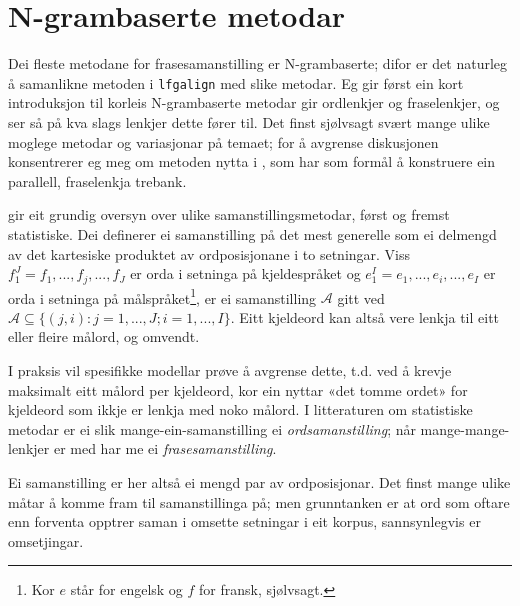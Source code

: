 \documentclass[11pt,a4paper,oneside,draft]{book}
\begin{document}
\section{N-grambaserte metodar}
\label{sec-5.2}


 Dei fleste metodane for frasesamanstilling er N-grambaserte; difor er
 det naturleg å samanlikne metoden i \texttt{lfgalign} med slike metodar. Eg
 gir først ein kort introduksjon til korleis N-grambaserte metodar gir
 ordlenkjer og fraselenkjer, og ser så på kva slags lenkjer dette
 fører til. Det finst sjølvsagt svært mange ulike moglege metodar og
 variasjonar på temaet; for å avgrense diskusjonen konsentrerer eg meg
 om metoden nytta i \citet{samuelsson2007apa}, som har som formål å
 konstruere ein parallell, fraselenkja trebank.

 \citet[s.~20--21]{och2003scv} gir eit grundig oversyn over ulike
 samanstillingsmetodar, først og fremst statistiske. Dei definerer ei
 samanstilling på det mest generelle som ei delmengd av det kartesiske
 produktet av ordposisjonane i to setningar. Viss
 $f_{1}^{J}=f_1,...,f_j,...,f_J$ er orda i setninga på kjeldespråket
 og $e_{1}^{I}=e_1,...,e_i,...,e_I$ er orda i setninga på
 målspråket\footnote{Kor $e$ står for engelsk og $f$ for fransk, sjølvsagt. }, er ei samanstilling $\mathcal{A}$ gitt ved
 $\mathcal{A}\subseteq \{(j,i): j=1,...,J;i=1,...,I\}$. Eitt kjeldeord
 kan altså vere lenkja til eitt eller fleire målord, og omvendt.

 I praksis vil spesifikke modellar prøve å avgrense dette, t.d. ved å
 krevje maksimalt eitt målord per kjeldeord, kor ein nyttar «det tomme
 ordet» for kjeldeord som ikkje er lenkja med noko målord. I
 litteraturen om statistiske metodar er ei slik
 mange-ein-samanstilling ei \emph{ordsamanstilling}; når
 mange-mange-lenkjer er med har me ei \emph{frasesamanstilling}.

 Ei samanstilling er her altså ei mengd par av ordposisjonar. Det
 finst mange ulike måtar å komme fram til samanstillinga på; men
 grunntanken er at ord som oftare enn forventa opptrer saman i omsette
 setningar i eit korpus, sannsynlegvis er omsetjingar.
\end{document}
